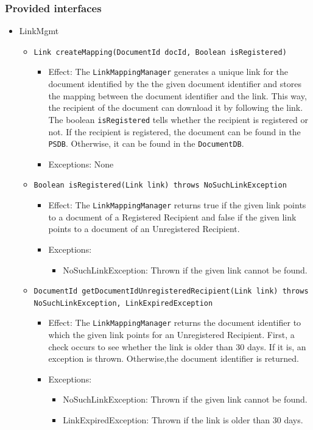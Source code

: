 \documentclass[a4paper,10pt]{article}
\begin{document}
\subsubsection*{Provided interfaces}
\begin{itemize}
    \item LinkMgmt
    \begin{itemize}
        \item \texttt{Link createMapping(DocumentId docId, Boolean isRegistered)}
        \begin{itemize}
            \item Effect: The \texttt{LinkMappingManager} generates a unique link for the document identified by the the given document identifier and stores the mapping between the document identifier and the link. This way, the recipient of the document can download it by following the link. The boolean \texttt{isRegistered} tells whether the recipient is registered or not. If the recipient is registered, the document can be found in the \texttt{PSDB}. Otherwise, it can be found in the \texttt{DocumentDB}.
            \item Exceptions: None
		\end{itemize}
		
		\item \texttt{Boolean isRegistered(Link link) throws NoSuchLinkException}
		 \begin{itemize}
            \item Effect: The \texttt{LinkMappingManager} returns true if the given link points to a document of a Registered Recipient and false if the given link points to a document of an Unregistered Recipient.
            \item Exceptions: 
            \begin{itemize}
            	\item NoSuchLinkException: Thrown if the given link cannot be found.
            \end{itemize}
		\end{itemize}

		\item \texttt{DocumentId getDocumentIdUnregisteredRecipient(Link link) throws NoSuchLinkException, LinkExpiredException}
		 \begin{itemize}
            \item Effect: The \texttt{LinkMappingManager} returns the document identifier to which the given link points for an Unregistered Recipient. First, a check occurs to see whether the link is older than 30 days. If it is, an exception is thrown. Otherwise,the document identifier is returned.
            \item Exceptions: 
            \begin{itemize}
            	\item NoSuchLinkException: Thrown if the given link cannot be found.
            	\item LinkExpiredException: Thrown if the link is older than 30 days.
            \end{itemize}
		\end{itemize}		


\end{itemize}
\end{itemize}
\end{document}
